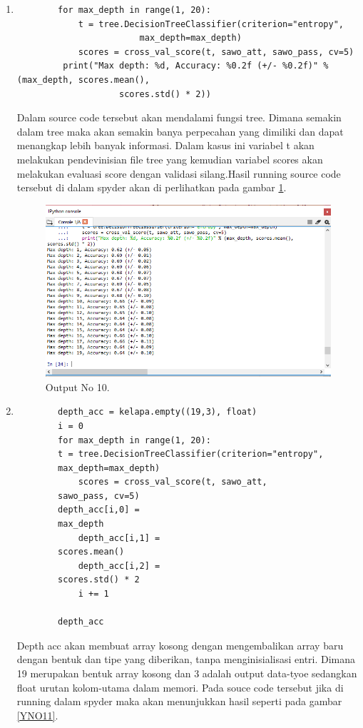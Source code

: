 \begin{enumerate}
		\item
	\begin{verbatim}
		for max_depth in range(1, 20):
    		t = tree.DecisionTreeClassifier(criterion="entropy", 
						max_depth=max_depth)
    		scores = cross_val_score(t, sawo_att, sawo_pass, cv=5)
   		 print("Max depth: %d, Accuracy: %0.2f (+/- %0.2f)" % (max_depth, scores.mean(), 
					scores.std() * 2))
	\end{verbatim}
	\subitem Dalam source code tersebut akan mendalami fungsi tree. Dimana semakin dalam tree maka akan semakin banya 				   perpecahan yang dimiliki dan dapat menangkap lebih banyak informasi. Dalam kasus ini variabel t akan melakukan 				  pendevinisian file tree yang kemudian variabel scores akan melakukan evaluasi score dengan validasi silang.Hasil running 			  source code tersebut di dalam spyder akan di perlihatkan pada gambar \ref{YNO10}.

	\begin{figure}[ht]
		\centerline{\includegraphics[width=1\textwidth]{figures/YN/YNBerhasil10.png}}
		\caption{Output No 10.}
		\label{YNO10}
	\end{figure}
	
		\item
	\begin{verbatim}
		depth_acc = kelapa.empty((19,3), float)
		i = 0
		for max_depth in range(1, 20):
   		t = tree.DecisionTreeClassifier(criterion="entropy", 
		max_depth=max_depth)
    		scores = cross_val_score(t, sawo_att, 
		sawo_pass, cv=5)
   		depth_acc[i,0] = 
		max_depth
    		depth_acc[i,1] = 
		scores.mean()
    		depth_acc[i,2] = 
		scores.std() * 2
    		i += 1
    
		depth_acc
	\end{verbatim}
	\subitem Depth acc akan membuat array kosong dengan mengembalikan array baru dengan bentuk dan tipe yang diberikan, 				    tanpa menginisialisasi entri. Dimana 19 merupakan bentuk array kosong dan 3 adalah output data-tyoe sedangkan float 			    urutan kolom-utama dalam memori. Pada souce code tersebut jika di running dalam spyder maka akan menunjukkan hasil 			    seperti pada gambar \ref{YNO11}.


\end{enumerate}
